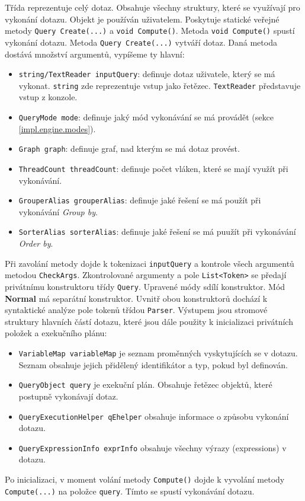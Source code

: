 Třída reprezentuje celý dotaz.
Obsahuje všechny struktury, které se využívají pro vykonání dotazu.
Objekt je používán uživatelem.
Poskytuje statické veřejné metody \texttt{Query Create(...)} a \texttt{void Compute()}.
Metoda \texttt{void Compute()} spustí vykonání dotazu.
Metoda \texttt{Query Create(...)} vytváří dotaz.
Daná metoda dostává množství argumentů, vypíšeme ty hlavní:
\begin{itemize}
\item \texttt{string/TextReader inputQuery}: definuje dotaz uživatele, který se má vykonat. \texttt{string} zde reprezentuje vstup jako řetězec. \texttt{TextReader} představuje vstup z konzole.
\item \texttt{QueryMode mode}: definuje jaký mód vykonávání se má provádět (sekce \ref{impl.engine.modes}).
\item \texttt{Graph graph}: definuje graf, nad kterým se má dotaz provést.
\item \texttt{ThreadCount threadCount}: definuje počet vláken, které se mají využít při vykonávání.
\item \texttt{GrouperAlias grouperAlias}: definuje jaké řešení se má použít při vykonávání \textit{Group by}.
\item \texttt{SorterAlias sorterAlias}: definuje jaké řešení se má puužít při vykonávání \textit{Order by}.
\end{itemize}
Při zavolání metody dojde k tokenizaci \texttt{inputQuery} a kontrole všech argumentů metodou \texttt{CheckArgs}.
Zkontrolované argumenty a pole \texttt{List<Token>} se předají privátnímu konstruktoru třídy \texttt{Query}.
Upravené módy sdílí konstruktor. Mód \textbf{Normal} má separátní konstruktor.
Uvnitř obou konstruktorů dochází k syntaktické analýze pole tokenů třídou \texttt{Parser}.
Výstupem jsou stromové struktury hlavních částí dotazu, které jsou dále použity k inicializaci privátních položek a exekučního plánu:
\begin{itemize}
\item \texttt{VariableMap variableMap} je seznam proměnných vyskytujících se v dotazu. Seznam obsahuje jejich přidělený identifikátor a typ, pokud byl definován.
\item \texttt{QueryObject query} je exekuční plán. Obsahuje řetězec objektů, které postupně vykonávají dotaz.
\item \texttt{QueryExecutionHelper qEhelper} obsahuje informace o způsobu vykonání dotazu. 
\item \texttt{QueryExpressionInfo exprInfo} obsahuje všechny výrazy (expressions) v dotazu.
\end{itemize}
Po inicializaci, v moment volání metody \texttt{Compute()} dojde k vyvolání metody \texttt{Compute(...)} na položce \texttt{query}.
Tímto se spustí vykonávání dotazu.

